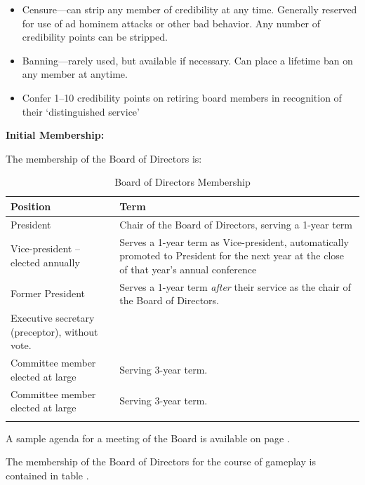\begin{refsection}
\begin{itemize}
\item Censure---can strip any member of credibility at any time. Generally reserved for use of ad hominem attacks or other bad behavior. Any number of credibility points can be stripped.

\item Banning---rarely used, but available if necessary. Can place a lifetime ban on any member at anytime.

\item Confer 1--10 credibility points on retiring board members in recognition of their ‘distinguished service’

\end{itemize}

\textbf{Initial Membership:}

The membership of the Board of Directors is:

 \begin{longtable}[!t]{ | p{3cm} |  p{10cm} | }
\hline
\textbf{Position}&\textbf{Term} \\ \hline
President&Chair of the Board of Directors, serving a 1-year term \\ \hline
Vice-president – elected annually&Serves a 1-year term as Vice-president, automatically promoted to President for the next year at the close of that year's annual conference \\ \hline
Former President&Serves a 1-year term \emph{after} their service as the chair of the Board of Directors. \\ \hline
Executive secretary (preceptor), without vote.& \\ \hline

Committee member elected at large&Serving 3-year term. \\ \hline
Committee member elected at large&Serving 3-year term. \\ \hline
\caption{Board of Directors Membership}
\label{table: boardMembership}
\end{longtable}

A sample agenda for a meeting of the Board is available on page .

The membership of the Board of Directors for the course of gameplay is contained in table .


\end{refsection}
